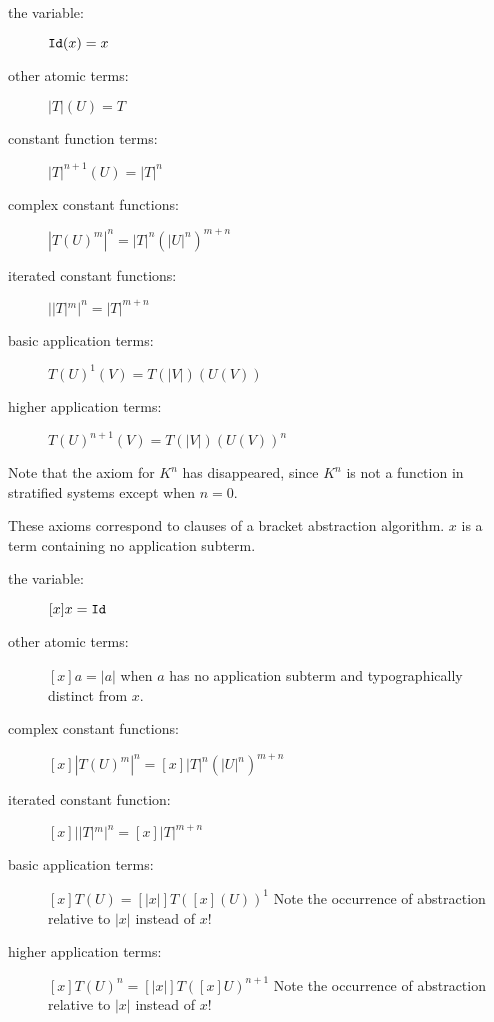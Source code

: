 \documentclass{article}
\begin{document}
\begin{description}

\item[the variable:] ${\tt Id}(x)=x$

\item[other atomic terms:]  $|T|(U) = T$

\item[constant function terms:]  $|T|^{n+1}(U) = |T|^n$

\item[complex constant functions:] $|T(U)^m|^n = |T|^n(|U|^n)^{m+n}$

\item[iterated constant functions:] $||T|^m|^n = |T|^{m+n}$

\item[basic application terms:]  $T(U)^1(V) = T(|V|)(U(V))$ 

\item[higher application terms:] $T(U)^{n+1}(V) = T(|V|)(U(V))^n$

\end{description}

Note that the axiom for $K^n$ has disappeared, since $K^n$ is not a function
in stratified systems except when $n=0$.

These axioms correspond to clauses of a bracket abstraction algorithm.  $x$ is
a term containing no application subterm.

\begin{description}

\item[the variable:] $[x]x={\tt Id}$

\item[other atomic terms:] $[x]a = |a|$ when $a$ has no application
subterm and typographically distinct from $x$.

\item[complex constant functions:] $[x]|T(U)^m|^n = [x]|T|^n(|U|^n)^{m+n}$

\item[iterated constant function:] $[x]||T|^m|^n = [x]|T|^{m+n}$

\item[basic application terms:]  $[x]T(U) = [|x|]T([x](U))^1$ Note the
occurrence of abstraction relative to $|x|$ instead of $x$!

\item[higher application terms:] $[x]T(U)^n = [|x|]T([x]U)^{n+1}$ Note the
occurrence of abstraction relative to $|x|$ instead of $x$!

\end{description}
\end{document}
